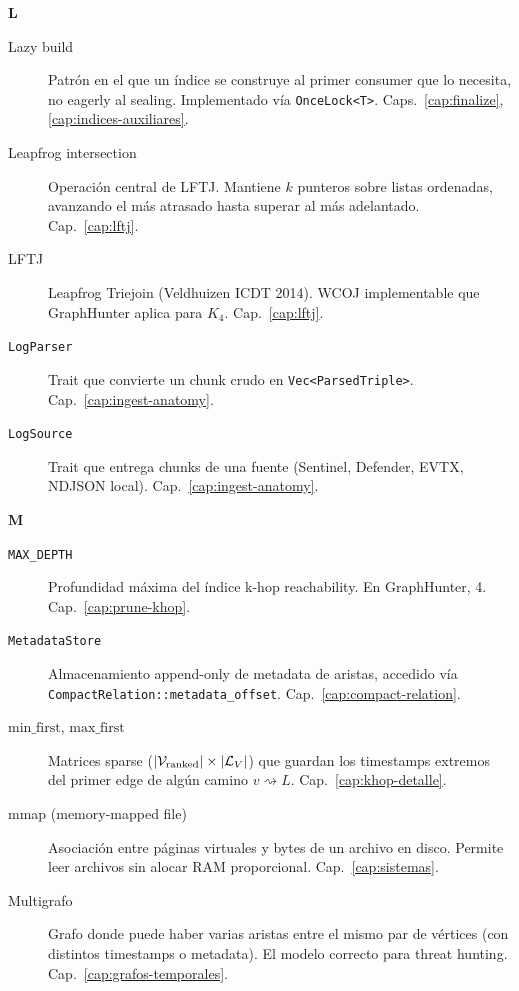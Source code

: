 \noindent
\textbf{L}

\begin{description}
    \item[Lazy build] Patrón en el que un índice se construye al
    primer consumer que lo necesita, no eagerly al
    sealing. Implementado vía \texttt{OnceLock<T>}. Caps.~\ref{cap:finalize},
    \ref{cap:indices-auxiliares}.

    \item[Leapfrog intersection] Operación central de LFTJ.
    Mantiene \(k\) punteros sobre listas ordenadas, avanzando el
    más atrasado hasta superar al más adelantado.
    Cap.~\ref{cap:lftj}.

    \item[LFTJ] Leapfrog Triejoin (Veldhuizen ICDT 2014). WCOJ
    implementable que GraphHunter aplica para \(K_4\).
    Cap.~\ref{cap:lftj}.

    \item[\texttt{LogParser}] Trait que convierte un chunk crudo
    en \texttt{Vec<ParsedTriple>}. Cap.~\ref{cap:ingest-anatomy}.

    \item[\texttt{LogSource}] Trait que entrega chunks de una
    fuente (Sentinel, Defender, EVTX, NDJSON local).
    Cap.~\ref{cap:ingest-anatomy}.
\end{description}

\noindent
\textbf{M}

\begin{description}
    \item[\texttt{MAX\_DEPTH}] Profundidad máxima del índice k-hop
    reachability. En GraphHunter, 4. Cap.~\ref{cap:prune-khop}.

    \item[\texttt{MetadataStore}] Almacenamiento append-only de
    metadata de aristas, accedido vía
    \texttt{CompactRelation::metadata\_offset}.
    Cap.~\ref{cap:compact-relation}.

    \item[\(\mathrm{min\_first}\), \(\mathrm{max\_first}\)] Matrices
    sparse (\(|\mathcal{V}_{\text{ranked}}| \times |\mathcal{L}_V|\)) que guardan
    los timestamps extremos del primer edge de algún camino
    \(v \rightsquigarrow L\). Cap.~\ref{cap:khop-detalle}.

    \item[mmap (memory-mapped file)] Asociación entre páginas
    virtuales y bytes de un archivo en disco. Permite leer
    archivos sin alocar RAM proporcional. Cap.~\ref{cap:sistemas}.

    \item[Multigrafo] Grafo donde puede haber varias aristas entre
    el mismo par de vértices (con distintos timestamps o
    metadata). El modelo correcto para threat hunting.
    Cap.~\ref{cap:grafos-temporales}.
\end{description}

